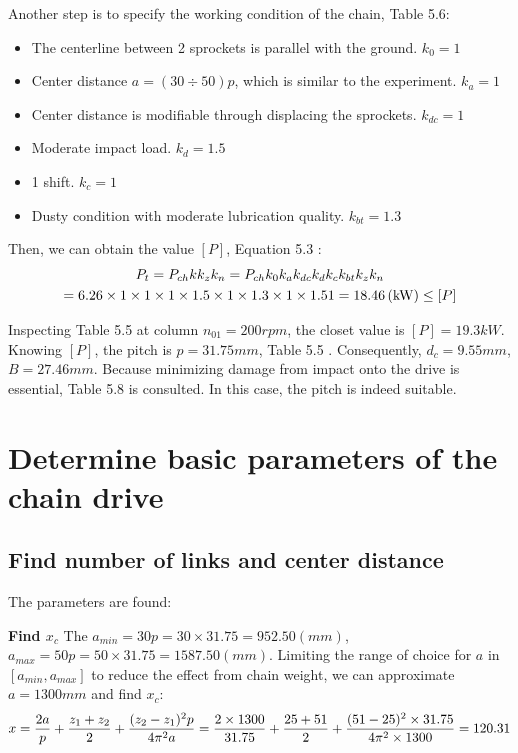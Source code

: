 Another step is to specify the working condition of the chain, Table 5.6:
\begin{itemize}
	\item The centerline between 2 sprockets is parallel with the ground. $ k_0 = 1 $
	\item Center distance $ a= (30\div 50)p $, which is similar to the experiment. $ k_a= 1 $
	\item Center distance is modifiable through displacing the sprockets. $ k_{dc}=1 $
	\item Moderate impact load. $ k_d=1.5 $
	\item 1 shift. $ k_c=1 $
	\item Dusty condition with moderate lubrication quality. $ k_{bt} =1.3$
\end{itemize}
Then, we can obtain the value $ [P] $, Equation 5.3 \cite{tk1}:
\begin{multline*}
	P_t=P_{ch}kk_zk_n=P_{ch}k_0k_ak_{dc}k_dk_ck_{bt}k_zk_n\\
	=6.26\times1\times1\times1\times1.5\times1\times1.3\times1\times1.51=18.46\, (\mathrm{kW})\leq[P]
\end{multline*}

Inspecting Table 5.5 \cite{tk1} at column $ n_{01}=200\unit{rpm} $, the closet value is $ [P]=19.3\unit{kW} $. Knowing $ [P] $, the pitch is $ p= 31.75 \unit{mm} $, Table 5.5 \cite{tk1}. Consequently, $ d_c=9.55\unit{mm} $, $ B=27.46\unit{mm} $. Because minimizing damage from impact onto the drive is essential, Table 5.8 \cite{tk1} is consulted. In this case, the pitch is indeed suitable.

\section{Determine basic parameters of the chain drive}
\subsection{Find number of links and center distance}
The parameters are found:

\textbf{Find $ x_c $} The  $ a_{min} = 30p = 30\times 31.75= 952.50 \unit{(mm)} $, $ a_{max} = 50p = 50\times 31.75 = 1587.50 \unit{(mm)}$. Limiting the range of choice for $ a $ in $ [a_{min},a_{max}] $ to reduce the effect from chain weight, we can approximate $ a = 1300 \unit{mm} $ and find $ x_c $:
\[x = \dfrac{2a}{p} + \dfrac{z_1+z_2}{2} + \dfrac{(z_2-z_1)^2p}{4\pi^2a}\\ = \dfrac{2\times 1300}{31.75} + \dfrac{25+51}{2} + \dfrac{(51-25)^2\times 31.75}{4\pi^2\times 1300}=120.31\]

